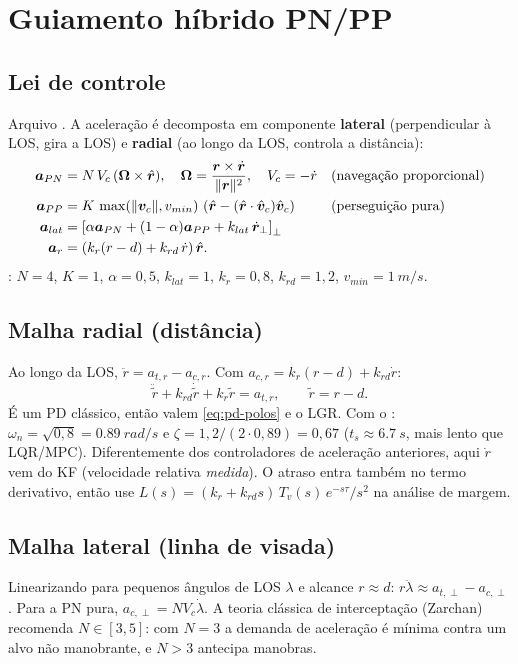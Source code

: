 \chapter{Guiamento híbrido PN/PP}
\label{cap:guiamento}

\section{Lei de controle}
Arquivo . A aceleração é decomposta em
componente \textbf{lateral} (perpendicular à LOS, gira a LOS) e \textbf{radial} (ao
longo da LOS, controla a distância):
\begin{align}
  \bm{a}_{PN} &= N\,V_c\,(\bm{\Omega}\times\hat{\bm{r}}),\quad
     \bm{\Omega} = \frac{\bm{r}\times\dot{\bm{r}}}{\lVert\bm{r}\rVert^2},\quad V_c = -\dot r
     && \text{(navegação proporcional)}\\
  \bm{a}_{PP} &= K\,\max(\lVert\bm{v}_c\rVert,v_{min})\,
     \left(\hat{\bm{r}} - (\hat{\bm{r}}\cdot\hat{\bm{v}}_c)\hat{\bm{v}}_c\right)
     && \text{(perseguição pura)}\\
  \bm{a}_{lat} &= \left[\alpha\bm{a}_{PN}+(1-\alpha)\bm{a}_{PP}
     + k_{lat}\,\dot{\bm{r}}_\perp\right]_\perp\\
  \bm{a}_r &= \left(k_r(r-d) + k_{rd}\,\dot r\right)\hat{\bm{r}} .
\end{align}
: $N=4$, $K=1$, $\alpha=0{,}5$, $k_{lat}=1$, $k_r=0{,}8$, $k_{rd}=1{,}2$,
$v_{min}=\SI{1}{m/s}$.

\section{Malha radial (distância)}
Ao longo da LOS, $\ddot r = a_{t,r} - a_{c,r}$. Com $a_{c,r}=k_r(r-d)+k_{rd}\dot r$:
\begin{equation}
  \ddot{\tilde r} + k_{rd}\dot{\tilde r} + k_r\tilde r = a_{t,r},\qquad \tilde r=r-d .
\end{equation}
É um PD clássico, então valem \eqref{eq:pd-polos} e o LGR. Com o :
$\omega_n=\sqrt{0{,}8}=\SI{0,89}{rad/s}$ e $\zeta=1{,}2/(2\cdot0{,}89)=0{,}67$ ($t_s\approx\SI{6,7}{s}$,
mais lento que LQR/MPC). Diferentemente dos controladores de aceleração anteriores,
aqui $\dot r$ vem do KF (velocidade relativa \emph{medida}). O atraso entra também no
termo derivativo, então use $L(s)=(k_r+k_{rd}s)\,T_v(s)\,e^{-s\tau}/s^2$ na análise de margem.

\section{Malha lateral (linha de visada)}
Linearizando para pequenos ângulos de LOS $\lambda$ e alcance $r\approx d$:
$r\ddot\lambda \approx a_{t,\perp} - a_{c,\perp}$. Para a PN pura,
$a_{c,\perp}=N V_c\dot\lambda$. A teoria clássica de interceptação
(Zarchan) recomenda $N\in[3,5]$: com $N=3$ a demanda de aceleração é mínima contra um
alvo não manobrante, e $N>3$ antecipa manobras.

